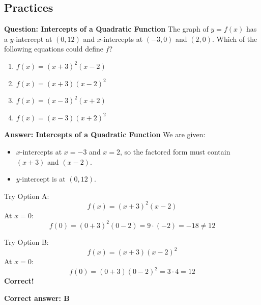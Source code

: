 \documentclass{beamer}
\begin{document}
\begin{frame}
\section{Practices}
\end{frame}


\begin{frame}{\textbf{Question: Intercepts of a Quadratic Function}}
The graph of $y = f(x)$ has a $y$-intercept at $(0, 12)$ and $x$-intercepts at $(-3, 0)$ and $(2, 0)$.  
Which of the following equations could define $f$?
\vspace{1em}

\begin{enumerate}
\item[A] $f(x) = (x + 3)^2(x - 2)$
\item[B] $f(x) = (x + 3)(x - 2)^2$
\item[C] $f(x) = (x - 3)^2(x + 2)$
\item[D] $f(x) = (x - 3)(x + 2)^2$
\end{enumerate}
\end{frame}

\begin{frame}{\textbf{Answer: Intercepts of a Quadratic Function}}
We are given:
\begin{itemize}
  \item $x$-intercepts at $x = -3$ and $x = 2$, so the factored form must contain $(x + 3)$ and $(x - 2)$.
  \item $y$-intercept is at $(0, 12)$.
\end{itemize}

Try Option A:
\[
f(x) = (x + 3)^2(x - 2)
\]
At $x = 0$:
\[
f(0) = (0 + 3)^2(0 - 2) = 9 \cdot (-2) = -18 \ne 12
\]

Try Option B:
\[
f(x) = (x + 3)(x - 2)^2
\]
At $x = 0$:
\[
f(0) = (0 + 3)(0 - 2)^2 = 3 \cdot 4 = 12
\]
\textbf{Correct!}

\bigskip
\textbf{Correct answer: B}
\end{frame}
\end{document}
